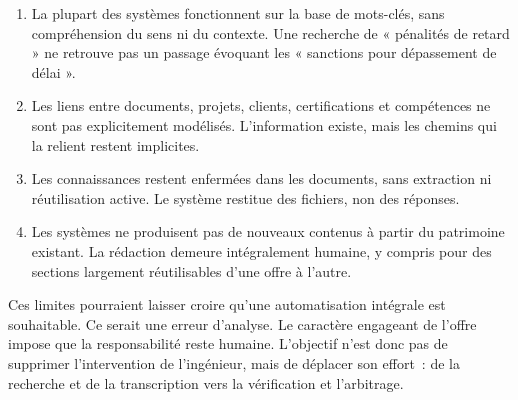 \begin{enumerate}
  \item {} La plupart des systèmes
        fonctionnent sur la base de mots-clés, sans compréhension du sens ni du
        contexte. Une recherche de « pénalités de retard » ne retrouve pas un
        passage évoquant les « sanctions pour dépassement de délai ».

  \item {} Les liens entre
        documents, projets, clients, certifications et compétences ne sont pas
        explicitement modélisés. L'information existe, mais les chemins qui la
        relient restent implicites.

  \item {} Les connaissances restent enfermées
        dans les documents, sans extraction ni réutilisation active. Le système
        restitue des fichiers, non des réponses.

  \item {} Les systèmes ne produisent pas de
        nouveaux contenus à partir du patrimoine existant. La rédaction demeure
        intégralement humaine, y compris pour des sections largement
        réutilisables d'une offre à l'autre.
\end{enumerate}

\begin{btpwarn}
Ces limites pourraient laisser croire qu'une automatisation intégrale est
souhaitable. Ce serait une erreur d'analyse. Le caractère engageant de l'offre
impose que la responsabilité reste humaine. L'objectif n'est donc pas de
supprimer l'intervention de l'ingénieur, mais de déplacer son effort~: de la
recherche et de la transcription vers la vérification et l'arbitrage.
\end{btpwarn}
